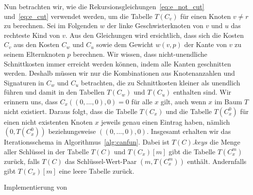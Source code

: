 Nun betrachten wir, wie die Rekursionsgleichungen~\eqref{eq:e_not_cut} und~\eqref{eq:e_cut} verwendet werden, um die Tabelle $T(C_v)$ für einen Knoten $v \neq r$ zu berechnen.
Sei im Folgenden $w$ der linke Geschwisterknoten von $v$ und $u$ das rechteste Kind von $v$.
Aus den Gleichungen wird ersichtlich, dass sich die Kosten $C_v$ aus den Kosten $C_w$ und $C_u$ sowie dem Gewicht $w(v, p)$ der Kante von $v$ zu seinem Elternknoten $p$ berechnen.
Wir wissen, dass nicht-unendliche Schnittkosten immer erreicht werden können, indem alle Kanten geschnitten werden.
Deshalb müssen wir nur die Kombinationen aus Knotenanzahlen und Signaturen in $C_w$ und $C_u$ betrachten, die zu Schnittkosten kleiner als unendlich führen und damit in den Tabellen $T(C_w)$ und $T(C_u)$ enthalten sind.
Wir erinnern uns, dass $C_x((0,\ldots, 0),0) = 0$ für alle $x$ gilt, auch wenn $x$ im Baum $T$ nicht existiert.
Daraus folgt, dass die Tabelle $T(C_x)$ und die Tabelle $T(C^0_x)$ für einen nicht existenten Knoten $x$ jeweils genau einen Eintrag haben, nämlich $(0, T(C^0_x))$ beziehungsweise $((0,\ldots,0), 0)$.
Insgesamt erhalten wir das Iterationsschema in Algorithmus~\ref{alg:canfun}.
Dabei ist $T(C).keys$ die Menge aller Schlüssel in der Tabelle $T(C)$ und $T(C_x)[m]$ gibt die Tabelle $T(C^m_x)$ zurück, falls $T(C)$ das Schlüssel-Wert-Paar $(m, T(C^m_x))$ enthält.
Andernfalls gibt $T(C_x)[m]$ eine leere Tabelle zurück.

\begin{algorithm}
    \caption{Implementierung von \canfun{}}\label{alg:canfun}
    \begin{algorithmic}[1]
                        \State {}
                        \State {}
                    \EndFor
                \EndFor
            \EndFor
        \EndFor
        \EndFunction
    \end{algorithmic}
\end{algorithm}

\newcommand{\encfun}{\textproc{edge\_not\_cut}}
\newcommand{\ecfun}{\textproc{edge\_cut}}

